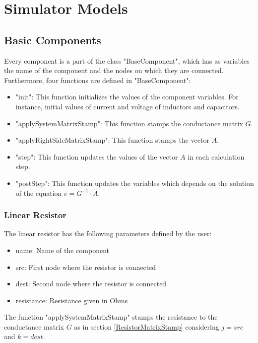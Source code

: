 \chapter{Simulator Models}

\section{Basic Components}

Every component is a part of the class "BaseComponent", which has as variables the name of the component and the nodes on which they are connected. Furthermore, four functions are defined in "BaseComponent":

\begin{itemize}
\item "init": This function initializes the values of the component variables. For  instance, initial values of current and voltage of inductors and capacitors.

\item "applySystemMatrixStamp": This function stamps the conductance matrix $G$.

\item "applyRightSideMatrixStamp": This function stamps the vector $A$.

\item "step": This function updates the values of the vector $A$ in each calculation step.

\item "postStep": This function updates the variables which depends on the solution of the equation $e=G^{-1} \cdot A$.
\end{itemize}

\subsection{Linear Resistor}
The linear resistor has the following parameters defined by the user:
\begin{itemize}
\item name: Name of the component
\item src: First node where the resistor is connected
\item dest: Second node where the resistor is connected
\item resistance: Resistance given in Ohms
\end{itemize}

The function "applySystemMatrixStamp" stamps the resistance to the conductance matrix $G$ as in section \ref{ResistorMatrixStamp} considering $j=src$ and $k=dest$.


